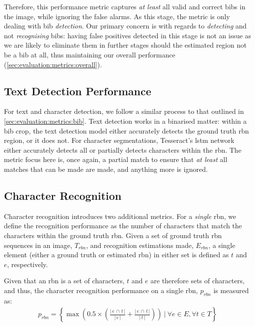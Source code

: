\noindent
Therefore, this performance metric captures \textit{at least} all valid and correct bibs in the image, while ignoring the false alarms. As this stage, the metric is only dealing with bib \textit{detection}. Our primary concern is with regards to \textit{detecting} and not \textit{recognising} bibs: having false positives detected in this stage is not an issue as we are likely to eliminate them in further stages should the estimated region not be a bib at all, thus maintaining our overall performance (\cref{sec:evaluation:metrics:overall}).

\subsection{Text Detection Performance}

For text and character detection, we follow a similar process to that outlined in \cref{sec:evaluation:metrics:bib}. Text detection works in a binarised matter: within a bib crop, the text detection model either accurately detects the ground truth \gls{rbn} region, or it does not. For character segmentations, Tesseract's \gls{lstm} network either accurately detects all or partially detects characters within the \gls{rbn}. The metric focus here is, once again, a partial match to ensure that \textit{at least} all matches that can be made are made, and anything more is ignored.

\subsection{Character Recognition}

Character recognition introduces two additional metrics. For a \textit{single} \gls{rbn}, we define the recognition performance as the number of characters that match the characters within the ground truth \gls{rbn}. Given a set of ground truth \gls{rbn} sequences in an image, $T_{rbn}$, and recognition estimations made, $E_{rbn}$, a single element (either a ground truth or estimated \gls{rbn}) in either set is defined as $t$ and $e$, respectively.

Given that an \gls{rbn} is a set of characters, $t$ and $e$ are therefore sets of characters, and thus, the character recognition performance on a single \gls{rbn}, $p_{rbn}$ is measured as:
\begin{align*}
  p_{rbn} = \left\{ \max \left(0.5 \times \left(\frac{\lvert\,e\,\cap\,t\,\rvert}{\lvert\,e\,\rvert} + \frac{\lvert\,e\,\cap\,t\,\rvert}{\lvert\,t\,\rvert} \right) \right)\ |\ \forall e \in E, \forall t \in T \right\}
\end{align*}

